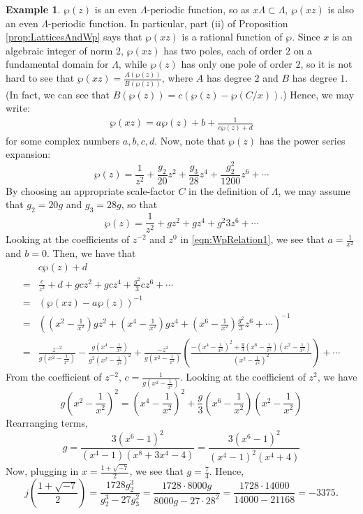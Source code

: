 \documentclass{amsart}
\theoremstyle{definition}
\newtheorem{example}[thm]{Example}
\theoremstyle{remark}
\numberwithin{equation}{section}
\newcommand{\inv}{^{-1}}
\begin{document}
\begin{example}
 $\wp(z)$ is an even $\Lambda$-periodic function, so as $x\Lambda \subset \Lambda$, $\wp(xz)$ is also an even $\Lambda$-periodic function. In particular, part (ii) of Proposition \ref{prop:LatticesAndWp} says that $\wp(xz)$ is a rational function of $\wp$. Since $x$ is an algebraic integer of norm $2$, $\wp(xz)$ has two poles, each of order $2$ on a fundamental domain for $\Lambda$, while $\wp(z)$ has only one pole of order $2$, so it is not hard to see that $\wp(xz) = \frac{A(\wp(z))}{B(\wp(z))}$, where $A$ has degree $2$ and $B$ has degree $1$. (In fact, we can see that $B(\wp(z)) = c(\wp(z) - \wp(C/x)).$) Hence, we may write:
 \begin{align} \label{eqn:WpRelation1}
 \wp(xz) = a \wp(z) + b + \frac{1}{c \wp(z) + d}
 \end{align}
 for some complex numbers $a,b, c, d$. Now, note that $\wp(z)$ has the power series expansion:
 \[
 \wp(z) = \frac{1}{z^2} + \frac{g_{2}}{20} z^2 + \frac{g_{3}}{28}z^4 + \frac{g_{2}^2}{1200} z^6 + \cdots
 \]
 By choosing an appropriate scale-factor $C$ in the definition of $\Lambda$, we may assume that $g_{2} = 20 g$ and $g_{3} = 28 g$, so that 
 \[
  \wp(z) = \frac{1}{z^2} + g z^2 + g z^4 + {g^2}{3} z^6 + \cdots
 \]
 Looking at the coefficients of $z^{-2}$ and $z^0$ in \eqref{eqn:WpRelation1}, we see that
 $a = \frac{1}{x^2}$ and $b = 0$. Then, we have that
 \begin{align*}
  & c \wp(z) + d \\
   = & \frac{c}{z^2} + d + g c z^2 + g c z^4 + \frac{g^2}{3} c z^6 + \cdots\\
  = & (\wp(xz) - a \wp(z))\inv \\
  = & \left(\left(x^2 - \frac{1}{x^2}\right) g z^2 + \left(x^4 - \frac{1}{x^2}\right) g z^4 + \left(x^6 - \frac{1}{x^2}\right) \frac{g^2}{3} z^6 + \cdots \right)\inv\\
 = & \frac{z^{-2}}{g\left(x^2 - \frac{1}{x^2}\right)} - \frac{g\left(x^4 - \frac{1}{x^2}\right)}{g^2 \left(x^2 - \frac{1}{x^2}\right)^2} + \frac{-z^2}{g\left(x^2 - \frac{1}{x^2}\right)}
 \left(\frac{-\left(x^4 - \frac{1}{x^2}\right)^2 + \frac{g}{3}\left(x^6 - \frac{1}{x^2}\right)\left(x^2 - \frac{1}{x^2}\right) }{ \left(x^2 - \frac{1}{x^2}\right)^2}\right) + \cdots
 \end{align*}
 From the coefficient of $z^{-2}$, $c = \frac{1}{g\left(x^2 - \frac{1}{x^2}\right)}$. Looking at the coefficient of $z^{2}$, we have
 \[
 g \left(x^2 - \frac{1}{x^2}\right)^2 = \left(x^4 - \frac{1}{x^2}\right)^2 + \frac{g}{3}\left(x^6 - \frac{1}{x^2}\right)\left(x^2 - \frac{1}{x^2}\right)
 \]
 Rearranging terms, 
 \[
 g = \frac{3(x^6 - 1)^2}{(x^4 - 1)(x^8 + 3 x^4 - 4)} = \frac{3(x^6 - 1)^2}{(x^4 - 1)^2(x^4 + 4)}
 \]
 Now, plugging in $x = \frac{1 + \sqrt{-7}}{2}$, we see that $g = \frac{7}{4}$. Hence,
 \[
 j\left(\frac{1 + \sqrt{-7}}{2}\right) =  \frac{1728 g_2^3}{g_{2}^3 - 27 g_{3}^2} = \frac{1728\cdot 8000 g}{8000 g - 27\cdot 28^2} = \frac{1728\cdot 14000 }{14000  - 21168} %
 = -3375.
 \]
 

\end{example}
\end{document}

